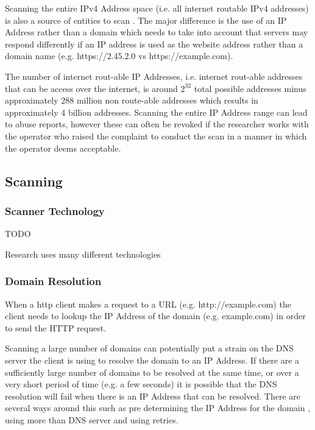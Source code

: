 \documentclass{mscreport}
\begin{document}
Scanning the entire IPv4 Address space (i.e. all internet routable IPv4 addresses) is also a source of entities to scan \cite{Kotzias2018-wd}. The major difference is the use of an IP Address rather than a domain which needs to take into account that servers may respond differently if an IP address is used as the website address rather than a domain name (e.g. https://2.45.2.0 vs https://example.com).

\vspace{0.3cm} \noindent
The number of internet rout-able IP Addresses, i.e. internet rout-able addresses that can be access over the internet, is around \(2^{32}\) total possible addresses minus approximately 288 million non route-able addresses which results in approximately 4 billion addresses. Scanning the entire IP Address range can lead to abuse reports, however these can often be revoked if the researcher works with the operator who raised the complaint to conduct the scan in a manner in which the operator deems acceptable.

\subsection{Scanning}


\subsubsection{Scanner Technology}

TODO

Research uses many different technologies

\subsubsection{Domain Resolution}

When a http client makes a request to a URL (e.g. http://example.com) the client needs to lookup the IP Address of the domain (e.g. example.com) in order to send the HTTP request.

\vspace{0.3cm} \noindent
Scanning a large number of domains can potentially put a strain on the DNS server the client is using to resolve the domain to an IP Address. If there are a sufficiently large number of domains to be resolved at the same time, or over a very short period of time (e.g. a few seconds) it is possible that the DNS resolution will fail when there is an IP Address that can be resolved. There are several ways around this such as pre determining the IP Address for the domain \cite{Amann2017-co}, using more than DNS server and using retries.
\end{document}
